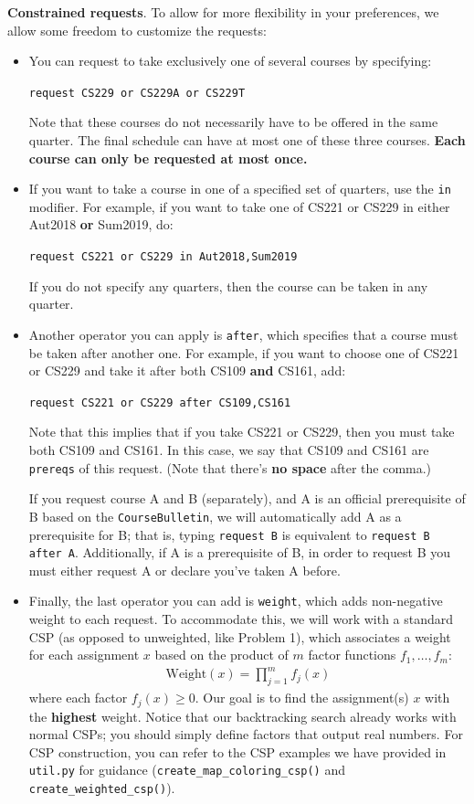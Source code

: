 \documentclass{article}
\theoremstyle{case}
\theoremstyle{definition}
\begin{document}
\textbf{Constrained requests}. To allow for more flexibility in your preferences, we allow some freedom to customize the requests: 
\begin{itemize}
\item
You can request to take exclusively one of several courses by specifying: 

\texttt{request CS229 or CS229A or CS229T}

Note that these courses do not necessarily have to be offered in the same quarter. The final schedule can have at most one of these three courses. \textbf{Each course can only be requested at most once.}
\item  If you want to take a course in one of a specified set of quarters, use the \texttt{in} modifier. For example, if you want to take one of CS221 or CS229 in either Aut2018 \textbf{or} Sum2019, do: 

\texttt{request CS221 or CS229 in Aut2018,Sum2019}

 If you do not specify any quarters, then the course can be taken in any quarter. 
 \item
Another operator you can apply is \texttt{after}, which specifies that a course must be taken after another one. For example, if you want to choose one of CS221 or CS229 and take it after both CS109 \textbf{and} CS161, add:

\texttt{request CS221 or CS229 after CS109,CS161}

 Note that this implies that if you take CS221 or CS229, then you must take both CS109 and CS161. In this case, we say that CS109 and CS161 are \texttt{prereqs} of this request. (Note that there's \textbf{no space} after the comma.) 
 
If you request course A and B (separately), and A is an official prerequisite of B based on the \texttt{CourseBulletin}, we will automatically add A as a prerequisite for B; that is, typing \texttt{request B} is equivalent to \texttt{request B after A}. Additionally, if A is a prerequisite of B, in order to request B you must either request A or declare you've taken A before.

\item
Finally, the last operator you can add is \texttt{weight}, which adds non-negative weight to each request. To accommodate this, we will work with a standard CSP (as opposed to unweighted, like Problem 1), which associates a weight for each assignment $x$ based on the product of $m$ factor functions $f_1,\dots,f_m$: 
\begin{align*}
\text{Weight}(x) = \prod_{j=1}^m f_j(x)
\end{align*}
where each factor $f_j(x)\geq 0$. Our goal is to find the assignment(s) $x$ with the \textbf{highest} weight. Notice that our backtracking search already works with normal CSPs; you should simply define factors that output real numbers. For CSP construction, you can refer to the CSP examples we have provided in \texttt{util.py} for guidance (\texttt{create\_map\_coloring\_csp()} and \texttt{create\_weighted\_csp()}). 


\end{itemize}
\end{document}
